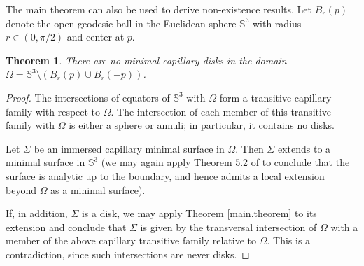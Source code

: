 \documentclass[11pt,reqno]{amsart}
\newtheorem{theorem}{Theorem}[section]
\begin{document}
The main theorem can also be used to derive non-existence results. Let $B_r(p)$ denote the open geodesic ball in the Euclidean sphere $\mathbb{S}^3$ with radius $r\in (0,\pi/2)$ and center at $p$.

\begin{theorem}
    There are no minimal capillary disks in the domain $\Omega=\mathbb{S}^3\setminus (B_r(p)\cup B_r(-p))$.
\end{theorem}

\begin{proof}
    The intersections of equators of $\mathbb{S}^3$ with $\Omega$ form a transitive capillary family with respect to $\Omega$. The intersection of each member of this transitive family with $\Omega$ is either a sphere or annuli; in particular, it contains no disks.
    
    Let $\Sigma$ be an immersed capillary minimal surface in $\Omega$. Then $\Sigma$ extends to a minimal surface in $\mathbb{S}^3$ (we may again apply Theorem 5.2 of \cite{KinNirSpr} to conclude that the surface is analytic up to the boundary, and hence admits a local extension beyond $\Omega$ as a minimal surface). 
    
    If, in addition, $\Sigma$ is a disk, we may apply Theorem \ref{main.theorem} to its extension and conclude that $\Sigma$ is given by the transversal intersection of $\Omega$ with a member of the above capillary transitive family relative to $\Omega$. This is a contradiction, since such intersections are never disks.
\end{proof}






\printbibliography[heading=bibintoc]%
\end{document}
